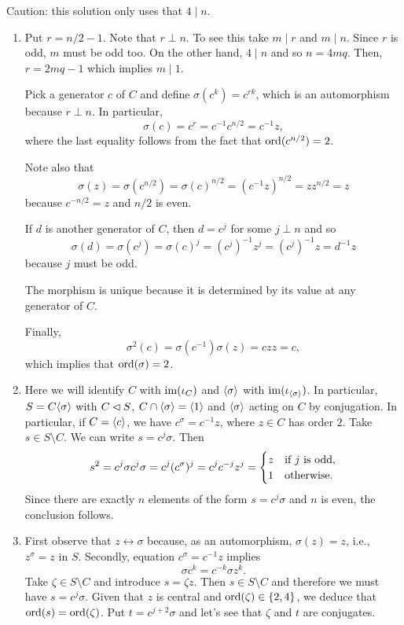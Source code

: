 \begin{solution} Caution: this solution only uses that $4\mid n$.
\begin{enumerate}[\rm a)]
    \item Put $r = n/2 - 1$. Note that $r\perp n$. To see this take $m\mid r$ and $m\mid n$. Since $r$ is odd, $m$ must be odd too. On the other hand, $4\mid n$ and so $n=4mq$. Then, $r=2mq-1$ which implies $m\mid1$.

    Pick a generator $c$ of $C$ and define $\sigma(c^k)=c^{rk}$, which is an automorphism because $r\perp n$. In particular,
    $$
        \sigma(c)=c^r = c^{-1}c^{n/2} = c^{-1}z,
    $$
    where the last equality follows from the fact that ${\rm ord}(c^{n/2})=2$.

    Note also that
    $$
        \sigma(z)=\sigma(c^{n/2})=\sigma(c)^{n/2}=(c^{-1}z)^{n/2}=zz^{n/2}=z
    $$
    because $c^{-n/2}=z$ and $n/2$ is even.

    If $d$ is another generator of $C$, then $d=c^j$ for some $j\perp n$ and so
    $$
        \sigma(d) = \sigma(c^j)=\sigma(c)^j=(c^j)^{-1}z^j=(c^j)^{-1}z=d^{-1}z
    $$
    because $j$ must be odd.
    
    The morphism is unique because it is determined by its value at any generator of $C$.

    Finally,
    $$
        \sigma^2(c) = \sigma(c^{-1})\sigma(z) = czz = c,
    $$
    which implies that ${\rm ord}(\sigma)=2$.
    
    \item Here we will identify $C$ with $\operatorname{im}(\iota_C)$ and $\langle\sigma\rangle$ with $\operatorname{im}(\iota_{\langle\sigma\rangle})$. In particular, $S=C\langle\sigma\rangle$ with $C\lhd S$, $C\cap\langle\sigma\rangle=\langle1\rangle$ and $\langle\sigma\rangle$ acting on $C$ by conjugation. In particular, if $C=\langle c\rangle$, we have $c^\sigma=c^{-1}z$, where $z\in C$ has order $2$. Take $s\in S\setminus C$. We can write $s=c^j\sigma$. Then
    $$
        s^2 = c^j\sigma c^j\sigma = c^j(c^\sigma)^j= c^jc^{-j}z^j
            = \begin{cases}
                z &\text{if }j\text{ is odd},\\
                1  &\rm otherwise.
            \end{cases}
    $$
    Since there are exactly $n$ elements of the form $s=c^j\sigma$ and $n$ is even, the conclusion follows.

    \item First observe that $z\leftrightarrow\sigma$ because, as an automorphism, $\sigma(z)=z$, i.e., $z^\sigma=z$ in $S$. Secondly,  equation $c^\sigma=c^{-1}z$ implies
    $$
        \sigma c^k=c^{-k}\sigma z^k.
    $$
    Take $\zeta\in S\setminus C$ and introduce $s=\zeta z$. Then $s\in S\setminus C$ and therefore we must have $s=c^j\sigma$. Given that $z$ is central and ${\rm ord}(\zeta)\in\{2,4\}$, we deduce that ${\rm ord}(s)={\rm ord}(\zeta)$. Put $t=c^{j+2}\sigma$ and let's see that $\zeta$ and $t$ are conjugates.


\end{enumerate}
\end{solution}
